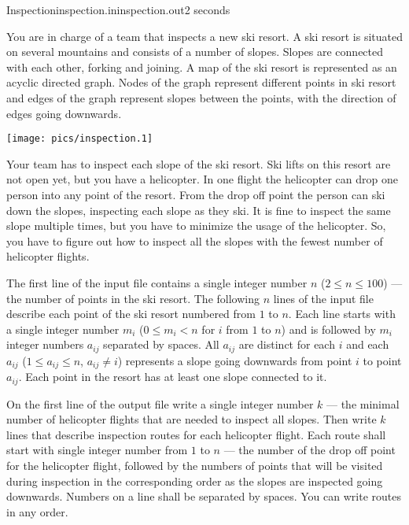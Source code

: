\begin{problem}{Inspection}{inspection.in}{inspection.out}{2 seconds}


You are in charge of a team that inspects a new ski resort. A ski resort
is situated on several mountains and consists of a number of slopes.
Slopes are connected with each other, forking and joining. A map of the 
ski resort is represented as an acyclic directed graph. Nodes of 
the graph represent different points in ski resort and edges of the graph 
represent slopes between the points, with the direction of edges
going downwards.

\begin{center}
\texttt{[image: pics/inspection.1]}
\end{center}

Your team has to inspect each slope of the ski resort. Ski lifts on
this resort are not open yet, but you 
have a helicopter. In one flight the
helicopter can drop one person into any point of the resort. 
From the drop off point the person 
can ski down the slopes, inspecting each slope as they ski. 
It is fine to inspect the same slope multiple times, but you have to 
minimize the usage of the helicopter. So, you have to figure out how 
to inspect all the slopes with the fewest number of helicopter flights.

\InputFile

The first line of the input file contains a single integer number
$n$ ($2 \le n \le 100$) --- the number of points in the ski resort.
The following $n$ lines of the input file describe each point of the ski resort 
numbered from $1$ to $n$. Each line starts with a single integer 
number $m_i$ ($0 \le m_i < n$ for $i$ from $1$ to $n$) and is followed
by $m_i$ integer numbers $a_{ij}$ separated by spaces. All $a_{ij}$ are distinct 
for each $i$ and each $a_{ij}$ ($1 \le a_{ij} \le n$, $a_{ij} \ne i$) 
represents a slope going downwards from point $i$ to point $a_{ij}$.
Each point in the resort has at least one slope connected to it.

\OutputFile

On the first line of the output file write a single integer number $k$ ---
the minimal number of helicopter flights that are needed to inspect all slopes.
Then write $k$ lines that describe inspection routes for each helicopter flight. 
Each route shall start with single integer number from $1$ to $n$  --- 
the number of the drop off point for the helicopter flight, followed by 
the numbers of points that will be visited during inspection in the corresponding 
order as the slopes are inspected going downwards. Numbers on a line shall 
be separated by spaces. You can write routes in any order.

\Example

\begin{example}
%
\end{example}

\end{problem}
